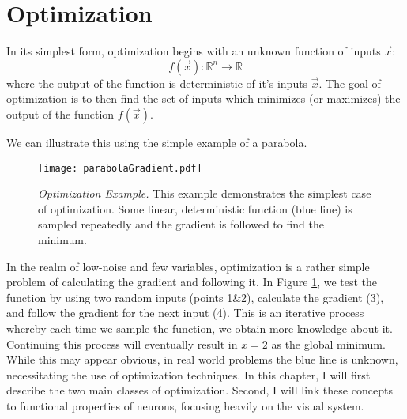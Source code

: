 \section{Optimization}
In its simplest form, optimization begins with an unknown function of inputs $\vec{x}$:
\begin{equation}
	f(\vec{x}) : \mathbb{R}^{n} \rightarrow \mathbb{R}
\end{equation}
where the output of the function is deterministic of it's inputs $\vec{x}$. The goal of optimization is to then find the set of inputs which minimizes (or maximizes) the output of the function $f(\vec{x})$. 

We can illustrate this using the simple example of a parabola. 
	\begin{figure}[h]
		\centering
		\texttt{[image: parabolaGradient.pdf]} 
		{\caption{{\it Optimization Example.} This example demonstrates the simplest case of optimization. Some linear, deterministic function (blue line) is sampled repeatedly and the gradient is followed to find the minimum.}
		\label{fig:parabolaGradient}}
	\end{figure}

In the realm of low-noise and few variables, optimization is a rather simple problem of calculating the gradient and following it. In Figure \ref{fig:parabolaGradient}, we test the function by using two random inputs (points 1\&2), calculate the gradient (3), and follow the gradient for the next input (4). This is an iterative process whereby each time we sample the function, we obtain more knowledge about it. Continuing this process will eventually result in $x=2$ as the global minimum. While this may appear obvious, in real world problems the blue line is unknown, necessitating the use of optimization techniques. In this chapter, I will first describe the two main classes of optimization. Second, I will link these concepts to functional properties of neurons, focusing heavily on the visual system.


